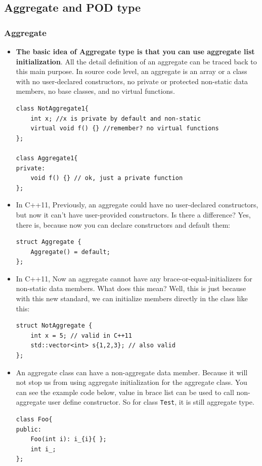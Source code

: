 \documentclass[a4paper,11pt,twoside]{book}
\begin{document}
\subsection{Aggregate and POD type}
\subsubsection{Aggregate}
\begin{itemize}
	
	\item \textbf{The basic idea of Aggregate type is that you can use aggregate list initialization}. All the detail definition of an aggregate can be traced back to this main purpose. In source code level, an aggregate is an array or a class with no user-declared constructors, no private or protected non-static data members, no base classes, and no virtual functions.
\begin{lstlisting}[numbers=none]
class NotAggregate1{
	int x; //x is private by default and non-static
	virtual void f() {} //remember? no virtual functions
};
		
class Aggregate1{
private:
	void f() {} // ok, just a private function
};
\end{lstlisting}

	\item In C++11, Previously, an aggregate could have no user-declared constructors, but now it can't have user-provided constructors. Is there a difference? Yes, there is, because now you can declare constructors and default them:
\begin{lstlisting}[numbers=none]
struct Aggregate {
	Aggregate() = default; 
};
\end{lstlisting}

	\item In C++11, Now an aggregate cannot have any brace-or-equal-initializers for non-static data members. What does this mean? Well, this is just because with this new standard, we can initialize members directly in the class like this:
\begin{lstlisting}[numbers=none]
struct NotAggregate {
	int x = 5; // valid in C++11
	std::vector<int> s{1,2,3}; // also valid
};
\end{lstlisting}

	\item  An aggregate class can have a non-aggregate data member. Because it will not stop us from using aggregate initialization for the aggregate class. You can see the example code below, value in brace list can be used to call non-aggregate user define constructor. So for class \texttt{Test}, it is still aggregate type.
\begin{lstlisting}[]
class Foo{
public:
    Foo(int i): i_{i}{ };
    int i_;
};


\end{lstlisting}
\end{itemize}
\end{document}
